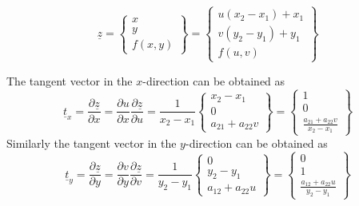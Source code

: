 \documentclass[
10pt, %
a4paper, %
oneside, %
headinclude,footinclude, %
BCOR5mm, %
]{scrartcl}
\begin{document}
\begin{equation}
  \underline{z} = \begin{Bmatrix} x \\ y \\ f(x, y) \end{Bmatrix} = \begin{Bmatrix} u (x_2 - x_1 ) + x_1 \\ v (y_2 - y_1) + y_1 \\ f(u, v)   \end{Bmatrix}
\end{equation}

The tangent vector in the $x$-direction can be obtained as
\begin{equation}
\underline{t}_x = \frac{\partial \underline{z}}{\partial x} =  \frac{\partial u}{\partial x} \frac{\partial \underline{z}}{\partial u}  = \frac{1}{x_2 - x_1} \begin{Bmatrix} {x_2 - x_1} \\ 0 \\ a_{21} + a_{22}v \end{Bmatrix} = \begin{Bmatrix} 1 \\ 0 \\ \frac{a_{21} + a_{22}v}{x_2 - x_1} \end{Bmatrix}
\end{equation}
Similarly the tangent vector in the $y$-direction can be obtained as
\begin{equation}
\underline{t}_y = \frac{\partial \underline{z}}{\partial y} =  \frac{\partial v}{\partial y} \frac{\partial \underline{z}}{\partial v}  = \frac{1}{y_2 - y_1} \begin{Bmatrix} 0 \\  {y_2 - y_1} \\ a_{12} + a_{22}u \end{Bmatrix} = \begin{Bmatrix} 0 \\ 1 \\ \frac{a_{12} + a_{22}u}{y_2 - y_1} \end{Bmatrix}
\end{equation}
\end{document}
